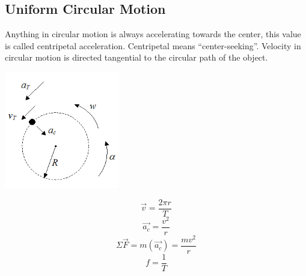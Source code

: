 \documentclass{article}
\begin{document}
  	\subsection{Uniform Circular Motion}
  		Anything in circular motion is always accelerating towards the center, this value is called centripetal acceleration. Centripetal means ``center-seeking''. Velocity in circular motion is directed tangential to the circular path of the object.
  		\begin{multicols}{2}
        	\centerline{\includegraphics[width=5cm]{circularMotion.png}}
            \columnbreak
  			\[
            	\vec{v}=\frac{2\pi r}{T}
            \]
  			\[
            	\vec{a_c}=\frac{v^2}{r}
            \]
  			\[
            	\Sigma\vec{F}=m(\vec{a_c})=\frac{mv^2}{r}
            \]
            \[
            	f=\frac{1}{T}
            \]
      	\end{multicols}
        
\end{document}
